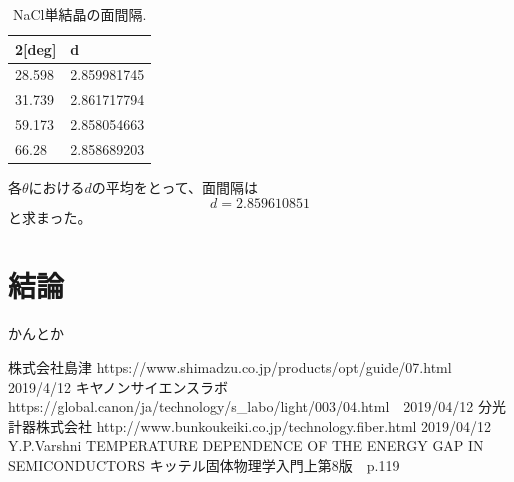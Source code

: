 \documentclass[11pt,a4j,uplatex]{jsarticle}
\begin{document}
\begin{table}[htbp]
 \begin{center}
  \caption{NaCl単結晶の面間隔.}
  \begin{tabular}{|l|l|}  \hline
   2[deg] & d           \\  \hline  \hline
   28.598 & 2.859981745 \\
   31.739 & 2.861717794 \\
   59.173 & 2.858054663 \\
   66.28  & 2.858689203 \\ \hline
  \end{tabular}
  \label{d}
 \end{center}
\end{table}

各$\theta$における$d$の平均をとって、面間隔は
\begin{equation}
 d=2.859610851
 \label{fin}
\end{equation}
と求まった。

\section{結論}
かんとか

\newpage
\begin{thebibliography}{9}
 株式会社島津 https://www.shimadzu.co.jp/products/opt/guide/07.html 2019/4/12
  キヤノンサイエンスラボ https://global.canon/ja/technology/s\_labo/light/003/04.html　2019/04/12
  分光計器株式会社 http://www.bunkoukeiki.co.jp/technology.fiber.html 2019/04/12
 Y.P.Varshni TEMPERATURE DEPENDENCE OF THE ENERGY GAP IN SEMICONDUCTORS
 キッテル固体物理学入門上第8版　p.119


\end{thebibliography}
\end{document}
